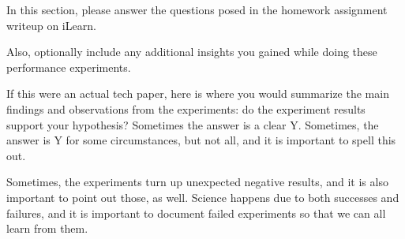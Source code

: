 In this section, please answer the questions posed in the homework assignment writeup on iLearn.

Also, optionally include any additional insights you gained while doing these performance experiments.

If this were an actual tech paper, here is where you would summarize the main findings and observations from the experiments: do the experiment results support your hypothesis? Sometimes the answer is a clear Y. Sometimes, the answer is Y for some circumstances, but not all, and it is important to spell this out.

Sometimes, the experiments turn up unexpected negative results, and it is also important to point out those, as well. Science happens due to both successes and failures, and it is important to document failed experiments so that we can all learn from them.



